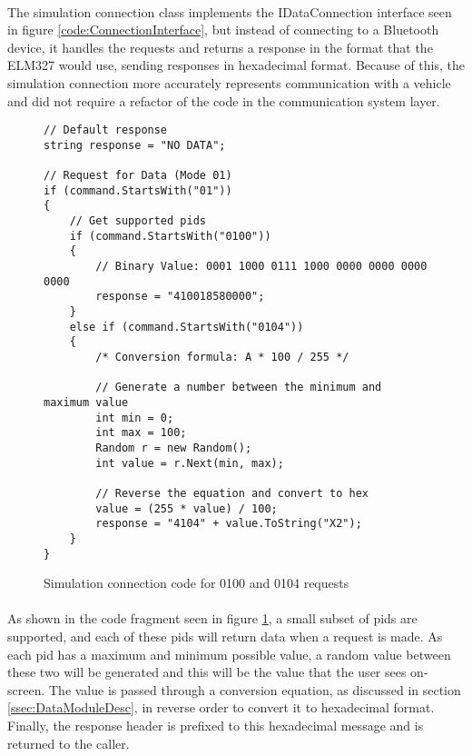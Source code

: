 {		\paragraph{}{
		The simulation connection class implements the IDataConnection interface seen in figure \ref{code:ConnectionInterface}, but instead of connecting to a Bluetooth device, it handles the requests and returns a response in the format that the ELM327 would use, sending responses in hexadecimal format. Because of this, the simulation connection more accurately represents communication with a vehicle and did not require a refactor of the code in the communication system layer.
		}	
		\begin{figure}[h]
			\begin{lstlisting}
// Default response
string response = "NO DATA";

// Request for Data (Mode 01)
if (command.StartsWith("01"))
{
	// Get supported pids
	if (command.StartsWith("0100"))
    {
		// Binary Value: 0001 1000 0111 1000 0000 0000 0000 0000
		response = "410018580000";
	}
    else if (command.StartsWith("0104"))
	{
    	/* Conversion formula: A * 100 / 255 */
    	
    	// Generate a number between the minimum and maximum value
        int min = 0;
		int max = 100;
        Random r = new Random();
		int value = r.Next(min, max);

		// Reverse the equation and convert to hex
        value = (255 * value) / 100;
		response = "4104" + value.ToString("X2");
	}
}
			\end{lstlisting}
			\caption{Simulation connection code for 0100 and 0104 requests}
			\label{code:SimConnectionData}
		\end{figure}

		\paragraph{}{
		As shown in the code fragment seen  in figure \ref{code:SimConnectionData}, a small subset of pids are supported, and each of these pids will return data when a request is made. As each pid has a maximum and minimum possible value, a random value between these two will be generated and this will be the value that the user sees on-screen. The value  is passed through a conversion equation, as discussed in section \ref{ssec:DataModuleDesc}, in reverse order to convert it to hexadecimal format. Finally, the response header is prefixed to this hexadecimal message and is returned to the caller.
		}
}
